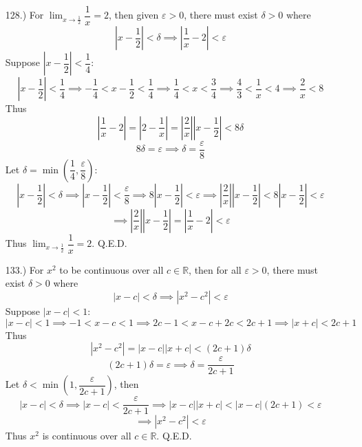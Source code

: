 \documentclass[12pt]{article}
\newcommand{\vertb}[1]{\left\vert#1\right\vert}
\newcommand{\parns}[1]{\left(#1\right)}
\newcommand{\e}{\varepsilon}
\newcommand{\lm}[1]{\displaystyle\lim_{#1}}
\begin{document}
\begin{itemize}
    \item [128.)] For $\lm{x\to\frac{1}{2}}\dfrac{1}{x}=2$, then given $\e>0$, there must exist $\delta>0$ where
    \[\vertb{x-\frac{1}{2}}<\delta\implies\vertb{\frac{1}{x}-2}<\e\]
    Suppose $\vertb{x-\dfrac{1}{2}}<\dfrac{1}{4}$:
    \[\vertb{x-\frac{1}{2}}<\frac{1}{4}\implies-\frac{1}{4}<x-\frac{1}{2}<\frac{1}{4}\implies\frac{1}{4}<x<\frac{3}{4}\implies\frac{4}{3}<\frac{1}{x}<4\implies\frac{2}{x}<8\]
    Thus
    \[\vertb{\frac{1}{x}-2}=\vertb{2-\frac{1}{x}}=\vertb{\frac{2}{x}}\vertb{x-\frac{1}{2}}<8\delta\]
    \[8\delta=\e\implies\delta=\frac{\e}{8}\]
    Let $\delta=\min\parns{\dfrac{1}{4},\dfrac{\e}{8}}$:
    \[\vertb{x-\frac{1}{2}}<\delta\implies\vertb{x-\frac{1}{2}}<\frac{\e}{8}\implies8\vertb{x-\frac{1}{2}}<\e\implies\vertb{\frac{2}{x}}\vertb{x-\frac{1}{2}}<8\vertb{x-\frac{1}{2}}<\e\]
    \[\implies\vertb{\frac{2}{x}}\vertb{x-\frac{1}{2}}=\vertb{\frac{1}{x}-2}<\e\]
    Thus $\lm{x\to\frac{1}{2}}\dfrac{1}{x}=2$. Q.E.D.




    \item [133.)] For $x^2$ to be continuous over all $c\in\mathbb{R}$, then for all $\e>0$, there must exist $\delta>0$ where
    \[\vertb{x-c}<\delta\implies\vertb{x^2-c^2}<\e\]
    Suppose $\vertb{x-c}<1$:
    \[\vertb{x-c}<1\implies-1<x-c<1\implies 2c-1<x-c+2c<2c+1\implies\vertb{x+c}<2c+1\]
    Thus
    \[\vertb{x^2-c^2}=\vertb{x-c}\vertb{x+c}<(2c+1)\delta\]
    \[(2c+1)\delta=\e\implies\delta=\frac{\e}{2c+1}\]
    Let $\delta<\min\parns{1,\dfrac{\e}{2c+1}}$, then
    \[\vertb{x-c}<\delta\implies\vertb{x-c}<\frac{\e}{2c+1}\implies\vertb{x-c}\vertb{x+c}<\vertb{x-c}(2c+1)<\e\]
    \[\implies\vertb{x^2-c^2}<\e\]
    Thus $x^2$ is continuous over all $c\in\mathbb{R}$. Q.E.D.


\end{itemize}
\end{document}
